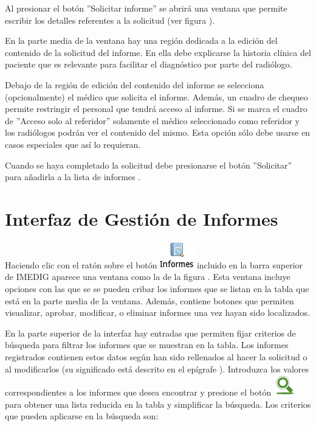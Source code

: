 \documentclass{plantilla-manual-usuario}
\begin{document}
Al presionar el botón ”Solicitar informe” se abrirá una ventana que permite escribir los detalles referentes a la solicitud (ver figura ).


En la parte media de la ventana hay una región dedicada a la edición del contenido de la solicitud del informe. En ella debe explicarse la historia clínica del paciente que es relevante para facilitar el diagnóstico por parte del radiólogo.

Debajo de la región de edición del contenido del informe se selecciona (opcionalmente) el médico que solicita el informe. Además, un cuadro de chequeo permite restringir el personal que tendrá acceso al informe. Si se marca el cuadro de ”Acceso solo al referidor” solamente el médico seleccionado como referidor y los radiólogos podrán ver el contenido del mismo. Esta opción sólo debe usarse en casos especiales que así lo requieran.

Cuando se haya completado la solicitud debe presionarse el botón ”Solicitar” para añadirla a la lista de informes .

\section{Interfaz de Gestión de Informes}\label{sectionGestiondeInformes}

Haciendo clic con el ratón sobre el botón \includegraphics[scale=0.6]{images/boton-informes.png} incluido en la barra superior de IMEDIG aparece una ventana como la de la figura . Esta ventana incluye opciones con las que se se pueden cribar los informes que se listan en la tabla que está en la parte media de la ventana. Además, contiene botones que permiten visualizar, aprobar, modificar, o eliminar informes una vez hayan sido localizados.


En la parte superior de la interfaz hay entradas que permiten fijar criterios de búsqueda para filtrar los informes que se muestran en la tabla. Los informes registrados contienen estos datos según han sido rellenados al hacer la solicitud o al modificarlos (su significado está descrito en el epígrafe ). Introduzca los valores correspondientes a los informes que desea encontrar y presione el botón \includegraphics[scale=0.4]{images/buscar-informes.png} para obtener una lista reducida en la tabla y simplificar la búsqueda. Los criterios que pueden aplicarse en la búsqueda son:
\end{document}

